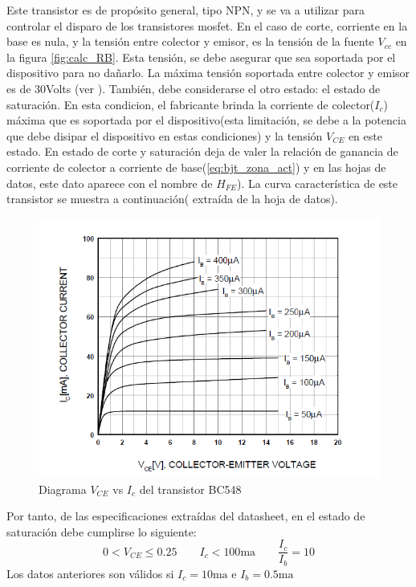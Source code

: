 Este transistor es de propósito general, tipo NPN, y se va a utilizar para controlar el disparo de los transistores mosfet. En el caso de corte, corriente en la base es nula, y la tensión entre colector y emisor, es la tensión de la fuente $V_{cc}$ en la figura \ref{fig:calc_RB}. Esta tensión, se debe asegurar que sea soportada por el dispositivo para no dañarlo. La máxima tensión soportada entre colector y emisor es de 30Volts (ver \cite{BC548}). También, debe considerarse el otro estado: el estado de saturación. En esta condicion, el fabricante brinda la corriente de colector($I_c$) máxima que es soportada por el dispositivo(esta limitación, se debe a la potencia que debe disipar el dispositivo en estas condiciones) y la tensión $V_{CE}$ en este estado. En estado de corte y saturación deja de valer la relación de ganancia de corriente de colector a corriente de base(\ref{eq:bjt_zona_act}) y en las hojas de datos, este dato aparece con el nombre de $H_{FE}$). La curva característica de este transistor se muestra a continuación( extraída de la hoja de datos).

\begin{figure}[ht!]
	\hspace{-20mm}
	\includegraphics{curvas_bjt_bc548}
	\caption{Diagrama $V_{CE}$ vs $I_c$ del transistor BC548}
\end{figure}


Por tanto, de las especificaciones extraídas del datasheet, en el estado de saturación debe cumplirse lo siguiente: 
\begin{equation*}
	0<V_{CE}\leq0.25 \qquad I_c<100\text{ma} \qquad \frac{I_c}{I_b} = 10
\end{equation*}
Los datos anteriores son válidos si $I_c = 10\text{ma}$ e $I_b = 0.5\text{ma}$
  
